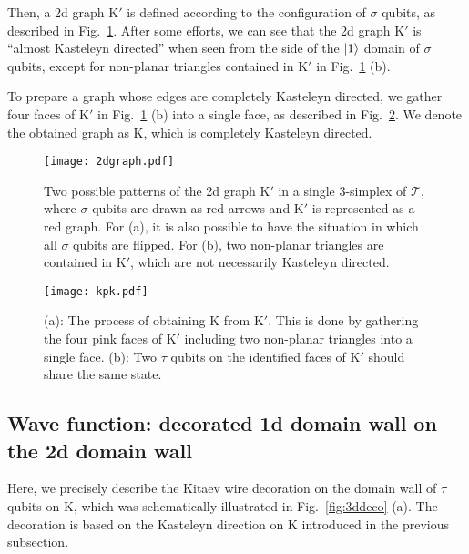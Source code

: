 \documentclass[12pt]{article}
\numberwithin{equation}{section}
\begin{document}
Then, a 2d graph $\mathrm{K}'$ is defined according to the configuration of $\sigma$ qubits, as described in Fig.~\ref{fig:2dgraph}.
After some efforts, we can see that the 2d graph $\mathrm{K}'$ is ``almost Kasteleyn directed'' when seen from the side of the $\ket{1}$ domain of $\sigma$ qubits, except for non-planar triangles contained in $\mathrm{K}'$ in Fig.~\ref{fig:2dgraph} (b).

To prepare a graph whose edges are completely Kasteleyn directed, we gather four faces of $\mathrm{K}'$ in Fig.~\ref{fig:2dgraph} (b) into a single face, as described in Fig.~\ref{fig:kpk}. We denote the obtained graph as $\mathrm{K}$, which is completely Kasteleyn directed.

\begin{figure}[htb]
\centering
\texttt{[image: 2dgraph.pdf]}
\caption{Two possible patterns of the 2d graph $\mathrm{K}'$ in a single 3-simplex of $\mathcal{T}$, where $\sigma$ qubits are drawn as red arrows and $\mathrm{K}'$ is represented as a red graph. For (a), it is also possible to have the situation in which all $\sigma$ qubits are flipped. For (b), two non-planar triangles are contained in $\mathrm{K}'$, which are not necessarily Kasteleyn directed.}
\label{fig:2dgraph}
\end{figure}

\begin{figure}[htb]
\centering
\texttt{[image: kpk.pdf]}
\caption{(a): The process of obtaining $\mathrm{K}$ from $\mathrm{K}'$. This is done by gathering the four pink faces of $\mathrm{K}'$ including two non-planar triangles into a single face. (b): Two $\tau$ qubits on the identified faces of $\mathrm{K}'$ should share the same state.}
\label{fig:kpk}
\end{figure}

\subsection{Wave function: decorated 1d domain wall on the 2d domain wall}
\label{subsec:wfn}
Here, we precisely describe the Kitaev wire decoration on the domain wall of $\tau$ qubits on $\mathrm{K}$, which was schematically illustrated in Fig.~\ref{fig:3ddeco} (a). The decoration is based on the Kasteleyn direction on $\mathrm{K}$ introduced in the previous subsection.
\end{document}
